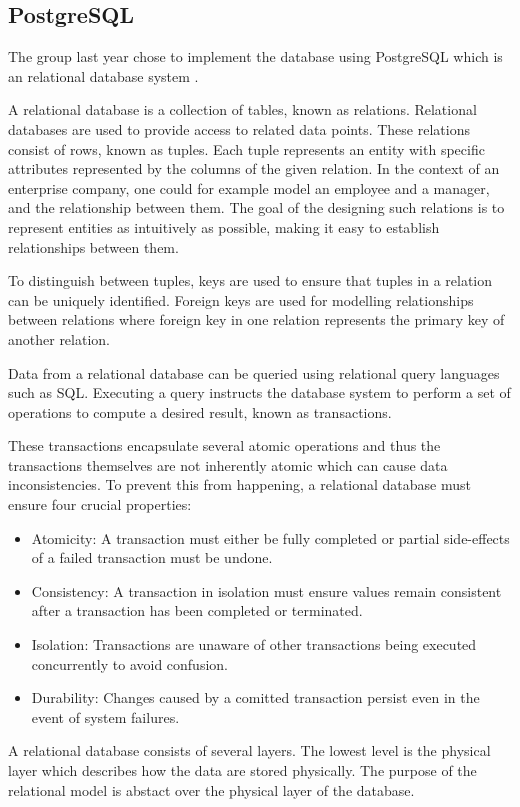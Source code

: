 \subsection{PostgreSQL}
The group last year chose to implement the database using PostgreSQL which is an relational database system \cite{knox2020}.

A relational database is a collection of tables, known as relations. Relational databases are used to provide access to related data points.
These relations consist of rows, known as tuples. Each tuple represents an entity with specific attributes represented by the columns of the given relation.
In the context of an enterprise company, one could for example model an employee and a manager, and the relationship between them.
The goal of the designing such relations is to represent entities as intuitively as possible, making it easy to establish relationships between them. 

To distinguish between tuples, keys are used to ensure that tuples in a relation can be uniquely identified.
Foreign keys are used for modelling relationships between relations where foreign key in one relation represents the primary key of another relation.

Data from a relational database can be queried using relational query languages such as SQL.
Executing a query instructs the database system to perform a set of operations to compute a desired result, known as transactions.

These transactions encapsulate several atomic operations and thus the transactions themselves are not inherently atomic which can cause data inconsistencies. 
To prevent this from happening, a relational database must ensure four crucial properties:
\begin{itemize}
    \item Atomicity: A transaction must either be fully completed or partial side-effects of a failed transaction must be undone.
    \item Consistency: A transaction in isolation must ensure values remain consistent after a transaction has been completed or terminated.
    \item Isolation: Transactions are unaware of other transactions being executed concurrently to avoid confusion.
    \item Durability: Changes caused by a comitted transaction persist even in the event of system failures.
\end{itemize}

A relational database consists of several layers.
The lowest level is the physical layer which describes how the data are stored physically.
The purpose of the relational model is abstact over the physical layer of the database.

